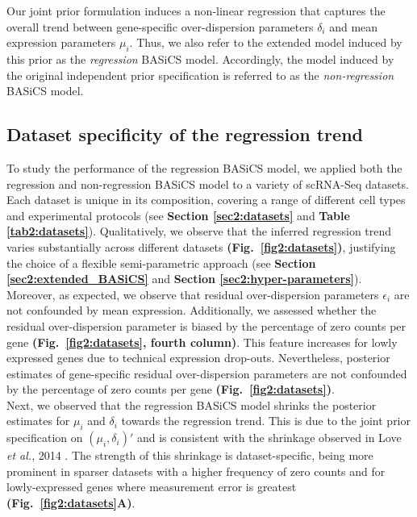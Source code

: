 Our joint prior formulation induces a non-linear regression that captures the overall trend between gene-specific over-dispersion parameters $\delta_i$ and mean expression parameters $\mu_i$. 
Thus, we also refer to the extended model induced by this prior as the \textit{regression} BASiCS model. 
Accordingly, the model induced by the original independent prior specification \citep{Vallejos2016} is referred to as the \textit{non-regression} BASiCS model. 

\subsection{Dataset specificity of the regression trend}

To study the performance of the regression BASiCS model, we applied both the regression and non-regression BASiCS model to a variety of scRNA-Seq datasets. 
Each dataset is unique in its composition, covering a range of different cell types and experimental protocols (see \textbf{Section \ref{sec2:datasets}} and \textbf{Table \ref{tab2:datasets}}). 
Qualitatively, we observe that the inferred regression trend varies substantially across different datasets \textbf{(Fig.~\ref{fig2:datasets})}, justifying the choice of a flexible semi-parametric approach (see \textbf{Section \ref{sec2:extended_BASiCS}} and \textbf{Section \ref{sec2:hyper-parameters}}). 
Moreover, as expected, we observe that residual over-dispersion parameters $\epsilon_i$ are not confounded by mean expression. 
Additionally, we assessed whether the residual over-dispersion parameter is biased by the percentage of zero counts per gene \textbf{(Fig.~\ref{fig2:datasets}, fourth column)}. 
This feature increases for lowly expressed genes due to technical expression drop-outs. 
Nevertheless, posterior estimates of gene-specific residual over-dispersion parameters are not confounded by the percentage of zero counts per gene \textbf{(Fig.~\ref{fig2:datasets})}. \\

Next, we observed that the regression BASiCS model shrinks the posterior estimates for $\mu_i$ and $\delta_i$ towards the regression trend. 
This is due to the joint prior specification on $(\mu_i,\delta_i)'$ and is consistent with the shrinkage observed in Love \emph{et al.}, 2014 \citep{Love2014}. 
The strength of this shrinkage is dataset-specific, being more prominent in sparser datasets with a higher frequency of zero counts and for lowly-expressed genes where measurement error is greatest \textbf{(Fig.~\ref{fig2:datasets}A)}. 

